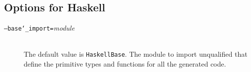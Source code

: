 \subsection{Options for Haskell}
\begin{description}
  \item[\normalfont\texttt{--base\char`\_import=}\textit{module}] \mbox{}\\
    The default value is \texttt{HaskellBase}. The module to import unqualified
    that define the primitive types and functions for all the generated
    code. 
\end{description}%

